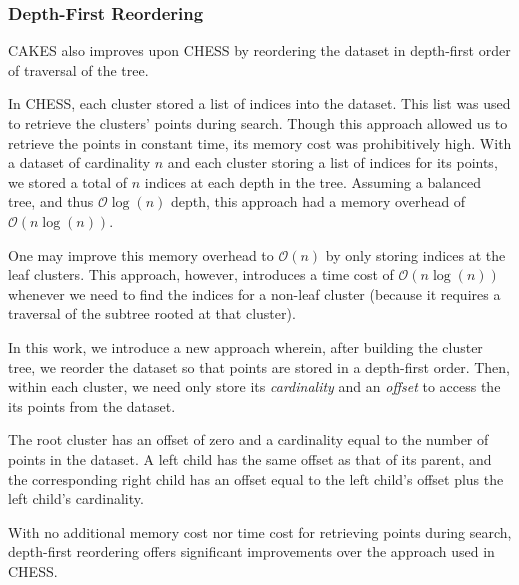 \subsubsection {Depth-First Reordering}
\label{subsubsec:methods:clustering:dataset-depth-first-reordering}

CAKES also improves upon CHESS by reordering the dataset in depth-first order of traversal of the tree.

In CHESS, each cluster stored a list of indices into the dataset.
This list was used to retrieve the clusters' points during search.
Though this approach allowed us to retrieve the points in constant time, its memory cost was prohibitively high.
With a dataset of cardinality $n$ and each cluster storing a list of indices for its points, we stored a total of $n$ indices at each depth in the tree.
Assuming a balanced tree, and thus $\mathcal{O}\log(n)$ depth, this approach had a memory overhead of $\mathcal{O}(n\log(n))$.

One may improve this memory overhead to $\mathcal{O}(n)$ by only storing indices at the leaf clusters.
This approach, however, introduces a time cost of $\mathcal{O}(n\log(n))$ whenever we need to find the indices for a non-leaf cluster (because it requires a traversal of the subtree rooted at that cluster).

In this work, we introduce a new approach wherein, after building the cluster tree, we reorder the dataset so that points are stored in a depth-first order.
Then, within each cluster, we need only store its \emph{cardinality} and an \emph{offset} to access the its points from the dataset.

The root cluster has an offset of zero and a cardinality equal to the number of points in the dataset.
A left child has the same offset as that of its parent, and the corresponding right child has an offset equal to the left child's offset plus the left child's cardinality.

With no additional memory cost nor time cost for retrieving points during search, depth-first reordering offers significant improvements over the approach used in CHESS.



